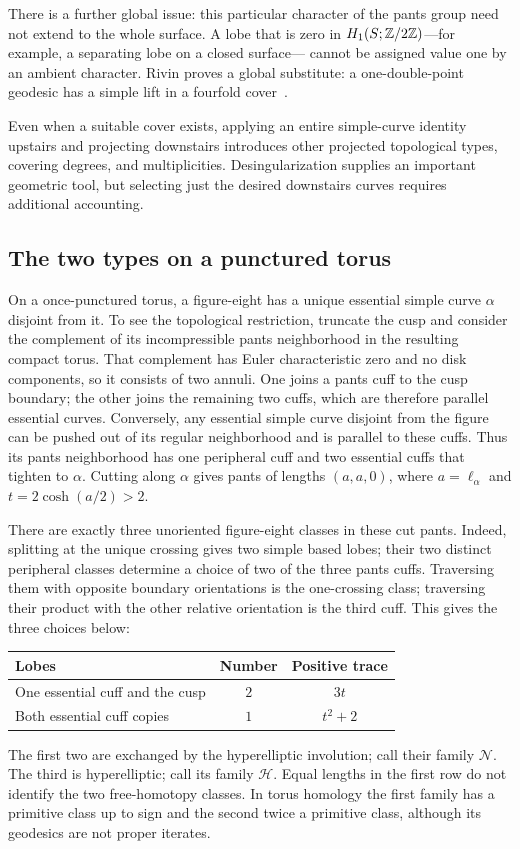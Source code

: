 There is a further global issue: this particular character of the pants
group need not extend to the whole surface. A lobe that is zero in
$H_1(S;\mathbb Z/2\mathbb Z)$---for example, a separating lobe on a closed surface---
cannot be assigned value one by an ambient character.
Rivin proves a global substitute: a one-double-point geodesic has a simple
lift in a fourfold cover~\cite[Theorem 4.2]{RivinFigures}.

Even when a suitable cover exists, applying an entire simple-curve identity
upstairs and projecting downstairs introduces other projected topological
types, covering degrees, and multiplicities. Desingularization supplies
an important geometric tool, but selecting just the desired downstairs
curves requires additional accounting.

\subsection{The two types on a punctured torus}

On a once-punctured torus, a figure-eight has a unique essential simple
curve $\alpha$ disjoint from it. To see the topological restriction,
truncate the cusp and consider the complement of its incompressible
pants neighborhood in the resulting compact torus. That complement has
Euler characteristic zero and no disk components, so it consists of two
annuli. One joins a pants cuff to the cusp boundary; the other joins the
remaining two cuffs, which are therefore parallel essential curves.
Conversely, any essential simple
curve disjoint from the figure can be pushed out of its regular
neighborhood and is parallel to these cuffs. Thus its pants neighborhood
has one peripheral cuff and two essential cuffs that tighten to $\alpha$.
Cutting along $\alpha$ gives pants of lengths $(a,a,0)$, where
$a=\ell_\alpha$ and $t=2\cosh(a/2)>2$.

There are exactly three unoriented figure-eight classes in these cut pants.
Indeed, splitting at the unique crossing gives two simple based lobes;
their two distinct peripheral classes determine a choice of two of the three
pants cuffs. Traversing them with opposite boundary orientations is the
one-crossing class; traversing their product with the other relative
orientation is the third cuff. This gives the three choices below:
\begin{center}
\begin{tabular}{@{}p{}c c@{}}
\toprule
Lobes & Number & Positive trace\\
\midrule
One essential cuff and the cusp & $2$ & $3t$\\
Both essential cuff copies & $1$ & $t^2+2$\\
\bottomrule
\end{tabular}
\end{center}
The first two are exchanged by the hyperelliptic involution; call their
family $\mathcal N$. The third is hyperelliptic; call its family
$\mathcal H$. Equal lengths in the first row do not identify the two
free-homotopy classes. In torus homology the first family has a primitive
class up to sign and the second twice a primitive class, although its
geodesics are not proper iterates.

